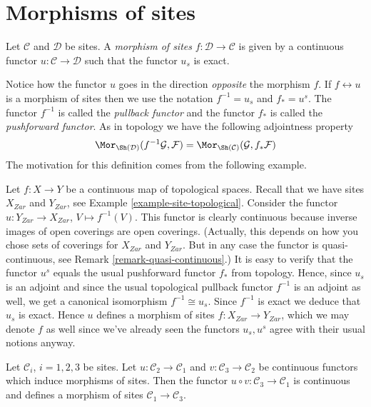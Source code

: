 \section{Morphisms of sites}
\label{section-morphism-sites}

\begin{definition}
\label{definition-morphism-sites}
Let $\mathcal{C}$ and $\mathcal{D}$ be sites.
A {\it morphism of sites} $f : \mathcal{D} \to \mathcal{C}$
is given by a continuous functor $u : \mathcal{C} \to \mathcal{D}$
such that the functor $u_s$ is exact.
\end{definition}

\noindent
Notice how the functor $u$ goes in the direction {\it opposite}
the morphism $f$. If $f \leftrightarrow u$ is a morphism of sites
then we use the notation $f^{-1} = u_s$ and $f_* = u^s$.
The functor $f^{-1}$ is called the {\it pullback functor} and
the functor $f_*$ is called the {\it pushforward functor}.
As in topology we have the following adjointness property
$$
\Mor_{\Sh(\mathcal{D})}(f^{-1}\mathcal{G}, \mathcal{F})
=
\Mor_{\Sh(\mathcal{C})}(\mathcal{G}, f_*\mathcal{F})
$$
The motivation for this definition comes from the following
example.

\begin{example}
\label{example-continuous-map}
Let $f : X  \to Y$ be a continuous map of topological spaces.
Recall that we have sites $X_{Zar}$ and $Y_{Zar}$,
see Example \ref{example-site-topological}. Consider the functor
$u : Y_{Zar} \to X_{Zar}$, $V \mapsto f^{-1}(V)$.
This functor is clearly continuous because inverse images of
open coverings are open coverings. (Actually, this depends on how
you chose sets of coverings for $X_{Zar}$ and $Y_{Zar}$.
But in any case the functor is quasi-continuous, see Remark
\ref{remark-quasi-continuous}.)
It is easy to verify that
the functor $u^s$ equals the usual pushforward functor $f_*$
from topology. Hence, since $u_s$ is an adjoint and since
the usual topological pullback functor $f^{-1}$ is an adjoint as well,
we get a canonical isomorphism $f^{-1} \cong u_s$. Since $f^{-1}$
is exact we deduce that $u_s$ is exact. Hence $u$ defines a morphism
of sites $f : X_{Zar} \to Y_{Zar}$, which we may denote
$f$ as well since we've already seen the functors $u_s, u^s$ agree
with their usual notions anyway.
\end{example}

\begin{lemma}
\label{lemma-composition-morphisms-sites}
Let $\mathcal{C}_i$, $i = 1, 2, 3$ be sites. Let
$u : \mathcal{C}_2 \to \mathcal{C}_1$ and
$v : \mathcal{C}_3 \to \mathcal{C}_2$ be continuous functors
which induce morphisms of sites. Then the functor
$u \circ v : \mathcal{C}_3 \to \mathcal{C}_1$ is continuous and
defines a morphism of sites $\mathcal{C}_1 \to \mathcal{C}_3$.
\end{lemma}

